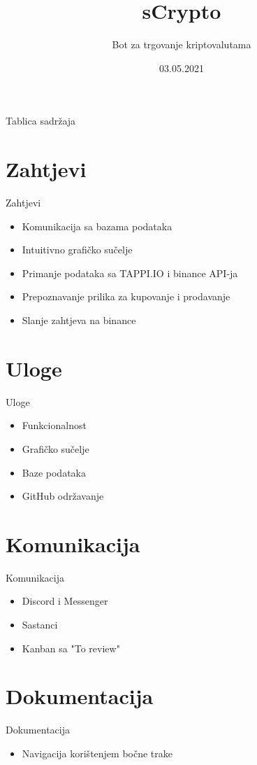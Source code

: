 \documentclass[aspectratio=169,xcolor=dvipsnames]{beamer}
\title[short title]{sCrypto}
\subtitle{Bot za trgovanje kriptovalutama}
\institute[RiTeh] 
{
Sveučilište u Rijeci - Tehnički fakultet 
}
\date{03.05.2021}
\begin{document}
\begin{frame}
  \titlepage
\end{frame}

\begin{frame}{Tablica sadržaja}
  \tableofcontents
\end{frame}


\section{Zahtjevi}
\begin{frame}{Zahtjevi}
    \begin{itemize}
        \item Komunikacija sa bazama podataka
        \item Intuitivno grafičko sučelje
        \item Primanje podataka sa TAPPI.IO i binance API-ja
        \item Prepoznavanje prilika za kupovanje i prodavanje
        \item Slanje zahtjeva na binance
    \end{itemize}
\end{frame}


\section{Uloge}
\begin{frame}{Uloge}
    \begin{itemize}
        \item Funkcionalnost
        \item Grafičko sučelje
        \item Baze podataka
        \item GitHub održavanje
    \end{itemize}
\end{frame}


\section{Komunikacija}
\begin{frame}{Komunikacija}
    \begin{itemize}
        \item Discord i Messenger
        \item Sastanci
        \item Kanban sa "To review"
    \end{itemize}
\end{frame}

\section{Dokumentacija}
\begin{frame}{Dokumentacija}
    \begin{itemize}
        \item Navigacija korištenjem bočne trake
    \end{itemize}
\end{frame}
\end{document}
